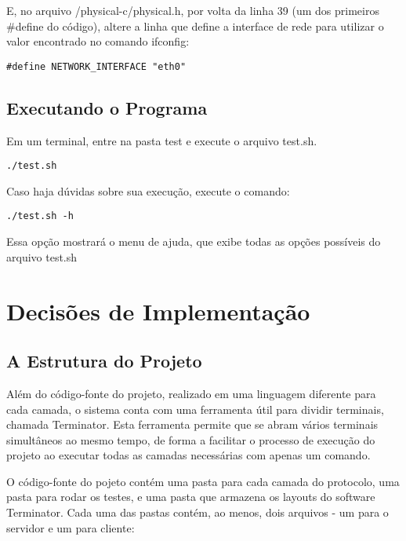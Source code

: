\documentclass[11pt]{article}
\begin{document}
        E, no arquivo /physical-c/physical.h, por volta da linha 39 (um dos primeiros \#define do código), altere a linha que define a interface de rede para utilizar o valor encontrado no comando ifconfig: 

\begin{lstlisting}
#define NETWORK_INTERFACE "eth0"
\end{lstlisting}  
        

	\subsection{Executando o Programa}
	    Em um terminal, entre na pasta test e execute o arquivo test.sh. 
\begin{lstlisting}
./test.sh
\end{lstlisting}
	    Caso haja dúvidas sobre sua execução, execute o comando:
	    
\begin{lstlisting}
./test.sh -h
\end{lstlisting}
	    Essa opção mostrará o menu de ajuda, que exibe todas as opções possíveis do arquivo test.sh
	
	
\section{Decisões de Implementação}
	
	\subsection{A Estrutura do Projeto}
		
		Além do código-fonte do projeto, realizado em uma linguagem diferente para cada camada, o sistema conta com uma ferramenta útil para dividir terminais, chamada Terminator. Esta ferramenta permite que se abram vários terminais simultâneos ao mesmo tempo, de forma a facilitar o processo de execução do projeto ao executar todas as camadas necessárias com apenas um comando.
		
		O código-fonte do pojeto contém uma pasta para cada camada do protocolo, uma pasta para rodar os testes, e uma pasta que armazena os layouts do software Terminator. Cada uma das pastas contém, ao menos, dois arquivos - um para o servidor e um para cliente:
		
\end{document}
